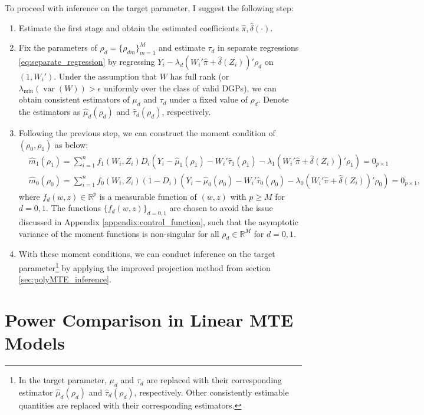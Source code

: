 \documentclass[11pt]{article}
\theoremstyle{definition}
\DeclareMathOperator{\var}{var}
\newcommand{\R}{\ensuremath{\mathbb{R}}}
\newcommand{\0}{\ensuremath{\mathbf{0}}}
\begin{document}
\begin{bibunit}
To proceed with inference on the target parameter, I suggest the following step:
\begin{enumerate}
	\item Estimate the first stage and obtain the estimated coefficients $\hat{\pi}, \hat{\delta}(\cdot)$.
	\item Fix the parameters of $\rho_d = \{\rho_{dm}\}_{m=1}^M$ and estimate $\tau_d$ in separate regressions \eqref{eq:separate_regression} by regressing $Y_i - \lambda_d(W_i'\hat{\pi} + \hat{\delta}(Z_i))'\rho_d$ on $(1,W_i')$. Under the assumption that $W$ has full rank (or $\lambda_{\min}(\var(W)) > \epsilon$ uniformly over the class of valid DGPs), we can obtain consistent estimators of $\mu_d$ and $\tau_d$ under a fixed value of $\rho_d$. Denote the estimators as $\hat{\mu}_d(\rho_d)$ and $\hat{\tau}_d(\rho_d)$, respectively.
	\item Following the previous step, we can construct the moment condition of $(\rho_0, \rho_1)$ as below:
	\begin{align*}
		& \hat{m}_1(\rho_1) = \sum_{i=1}^n f_1(W_i, Z_i) D_i\left(Y_i - \hat{\mu}_1(\rho_1) - W_i'\hat{\tau}_1(\rho_1) - \lambda_{1}(W_i'\hat{\pi} + \hat{\delta}(Z_i))'\rho_1\right) = 0_{p\times 1} \\
		& \hat{m}_0(\rho_0) = \sum_{i=1}^n f_0(W_i, Z_i) (1-D_i)\left(Y_i - \hat{\mu}_0(\rho_0) - W_i'\hat{\tau}_0(\rho_0) - \lambda_0(W_i'\hat{\pi} + \hat{\delta}(Z_i))'\rho_0\right) = 0_{p\times 1},
	\end{align*}
	where $f_d(w,z) \in \R^p$ is a measurable function of $(w,z)$ with $p \geq M$ for $d = 0,1$. The functions $\{f_d(w,z)\}_{d=0,1}$ are chosen to avoid the issue discussed in Appendix \ref{appendix:control_function}, such that the asymptotic variance of the moment functions is non-singular for all $\rho_d \in \R^M$ for $d = 0,1$.
	\item With these moment conditions, we can conduct inference on the target parameter\footnote{In the target parameter, $\mu_d$ and $\tau_d$ are replaced with their corresponding estimator $\hat{\mu}_d(\rho_d)$ and $\hat{\tau}_d(\rho_d)$, respectively. Other consistently estimable quantities are replaced with their corresponding estimators.} by applying the improved projection method from section \ref{sec:polyMTE_inference}.
\end{enumerate}


\newpage

%
\section{Power Comparison in Linear MTE Models}



\end{bibunit}
\end{document}
